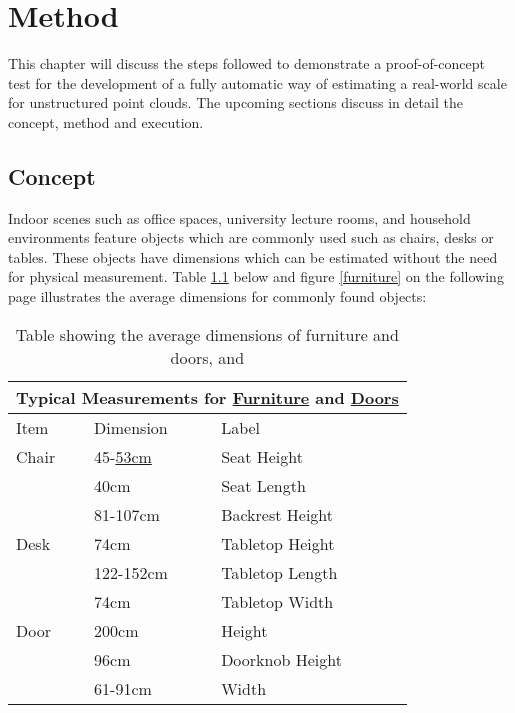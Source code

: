 
\chapter{Method} %
\label{Chapter3}

This chapter will discuss the steps followed to demonstrate a proof-of-concept test for the development of a fully automatic way of estimating a real-world scale for unstructured point clouds. The upcoming sections discuss in detail the concept, method and execution.
\vspace{-2.5mm}
\section{Concept\label{concept}}
\vspace{-2.5mm}
Indoor scenes such as office spaces, university lecture rooms, and household environments feature objects which are commonly used such as chairs, desks or tables. These objects have dimensions which can be estimated without the need for physical measurement. Table \ref{furnitureDim} below and figure \ref{furniture} on the following page illustrates the average dimensions for commonly found objects:

\begin{table}[h!]
	\centering
\begin{tabular}{|p{3cm}|p{3cm}|p{5cm}|}
	\hline
	\multicolumn{3}{|c|}{Typical Measurements for \href{http://www.fas.harvard.edu/~loebinfo/loebinfo/Proportions/furniture.html}{Furniture} and \href{http://www.fas.harvard.edu/~loebinfo/loebinfo/Proportions/stairsdoors.html}{Doors}} \\
	\hline
	Item & Dimension & Label \\
	\hline
	Chair &45-\href{http://www.spine-health.com/wellness/ergonomics/office-chair-choosing-right-ergonomic-office-chair}{53cm} & Seat Height \\
	 & 40cm & Seat Length\\
	 & 81-107cm & Backrest Height\\
	\hhline{|=|=|=|}
	Desk & 74cm & Tabletop Height \\
	& 122-152cm & Tabletop Length\\
	& 74cm & Tabletop Width\\
	\hhline{|=|=|=|}
	Door & 200cm & Height \\
	& 96cm & Doorknob Height\\
	& 61-91cm & Width \\
	\hline
\end{tabular}
\caption{Table showing the average dimensions of furniture and doors, \citep{lefler_choosing_2004} and \citep{griggs_typical_2001}}
\label{furnitureDim}
\end{table}

